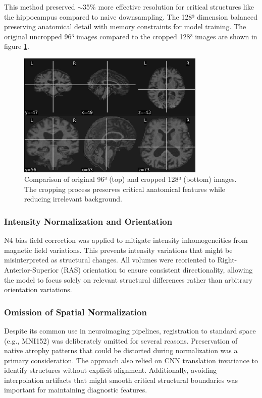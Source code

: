 \documentclass[11pt, a4paper]{article}
\begin{document}
This method preserved $\sim$35\% more effective resolution for critical structures like the hippocampus compared to naive downsampling. The 128³ dimension balanced preserving anatomical detail with memory constraints for model training. The original uncropped 96³ images compared to the cropped 128³ images are shown in figure \ref{fig:cropping}.
\begin{figure}[htbp]
  \centering
  \includegraphics[width=0.8\textwidth]{figures/cropping.png}
  \caption{Comparison of original 96³ (top) and cropped 128³ (bottom) images. The cropping process preserves critical anatomical features while reducing irrelevant background.}
  \label{fig:cropping}
\end{figure}

\subsubsection{Intensity Normalization and Orientation}

N4 bias field correction was applied to mitigate intensity inhomogeneities from magnetic field variations. This prevents intensity variations that might be misinterpreted as structural changes. All volumes were reoriented to Right-Anterior-Superior (RAS) orientation to ensure consistent directionality, allowing the model to focus solely on relevant structural differences rather than arbitrary orientation variations.

\subsubsection{Omission of Spatial Normalization}

Despite its common use in neuroimaging pipelines, registration to standard space (e.g., MNI152) was deliberately omitted for several reasons. Preservation of native atrophy patterns that could be distorted during normalization was a primary consideration. The approach also relied on CNN translation invariance to identify structures without explicit alignment. Additionally, avoiding interpolation artifacts that might smooth critical structural boundaries was important for maintaining diagnostic features.
\end{document}
